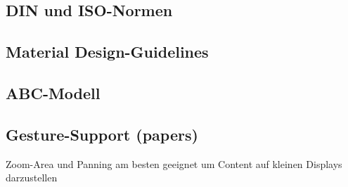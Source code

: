 \subsection{DIN und ISO-Normen}
\subsection{Material Design-Guidelines}
\subsection{ABC-Modell}
\subsection{Gesture-Support (papers)}
Zoom-Area und Panning am besten geeignet um Content auf kleinen Displays darzustellen \\

